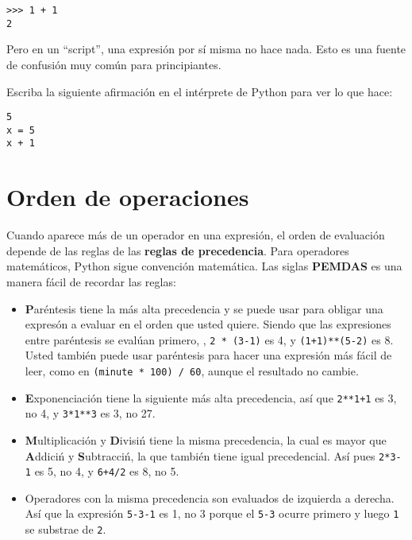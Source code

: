 \beforeverb
\begin{verbatim}
>>> 1 + 1
2
\end{verbatim}
\afterverb
%
Pero en un ``script'', una expresi\'on por s\'i misma no hace nada. Esto es una fuente de confusi\'on muy com\'un para principiantes.

\begin{ex}
Escriba la siguiente afirmaci\'on en el int\'erprete de Python para ver lo que hace:

\beforeverb
\begin{verbatim}
5
x = 5
x + 1
\end{verbatim}
\afterverb
%
\end{ex}


\section{Orden de operaciones}

Cuando aparece m\'as de un operador en una expresi\'on, el orden de evaluaci\'on depende de las reglas de las {\bf reglas de precedencia}.  Para operadores matem\'aticos, Python sigue convenci\'on matem\'atica.
Las siglas {\bf PEMDAS} es una manera f\'acil de recordar las reglas:


\begin{itemize}

\item {\bf P}ar\'entesis tiene la m\'as alta precedencia y se puede usar para obligar una expres\'on a evaluar en el orden que usted quiere. Siendo que las expresiones entre par\'entesis se eval\'uan primero, , {\tt 2 * (3-1)} es 4,
y {\tt (1+1)**(5-2)} es 8. Usted tambi\'en puede usar par\'entesis para hacer una expresi\'on m\'as f\'acil de leer, como en  {\tt (minute * 100) / 60}, aunque el resultado no cambie.

\item {\bf E}xponenciaci\'on tiene la siguiente m\'as alta precedencia, as\'i que 
{\tt 2**1+1} es 3, no 4, y {\tt 3*1**3} es 3, no 27.

\item {\bf M}ultiplicaci\'on y {\bf D}ivisi\'n tiene la misma precedencia,
la cual es mayor que {\bf A}ddici\'n y {\bf S}ubtracci\'n, la que tambi\'en tiene igual precedencial. As\'i pues {\tt 2*3-1} es 5, no 4, y
{\tt 6+4/2} es 8, no 5.

\item Operadores con la misma precedencia son evaluados de izquierda a derecha. As\'i que la expresi\'on {\tt 5-3-1} es 1, no 3 porque el 
{\tt 5-3} ocurre primero y luego {\tt 1} se substrae de {\tt 2}.

\end{itemize}

